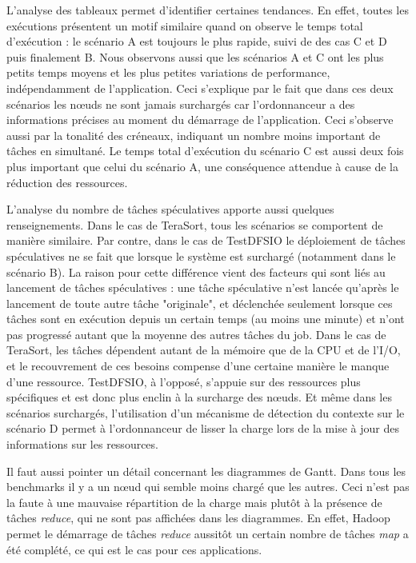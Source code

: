 L'analyse des tableaux permet d'identifier certaines tendances. En effet, toutes les exécutions présentent un motif similaire quand on observe le temps total d'exécution : le scénario A est toujours le plus rapide, suivi de des cas C et D puis finalement  B. Nous observons aussi que les scénarios A et C ont les plus petits temps moyens et les plus petites variations de performance, indépendamment de l'application. Ceci s'explique par le fait que dans ces deux scénarios les n{\oe}uds ne sont jamais surchargés car l'ordonnanceur a des informations précises au moment du démarrage de l'application. Ceci s'observe aussi par la tonalité des créneaux, indiquant un nombre moins important de tâches en simultané. Le temps total d'exécution du scénario C est aussi deux fois plus important que celui du scénario A, une conséquence attendue à cause de la réduction des ressources. 

L'analyse du nombre de tâches spéculatives apporte aussi quelques renseignements. Dans le cas de TeraSort, tous les scénarios se comportent de manière similaire. Par contre, dans le cas de TestDFSIO le déploiement de tâches spéculatives ne se fait que lorsque le système est surchargé (notamment dans le scénario B). La raison pour cette différence vient des facteurs qui sont liés au lancement de tâches spéculatives : une tâche spéculative n'est lancée qu'après le lancement de toute autre tâche "originale", et déclenchée seulement lorsque ces tâches sont en exécution depuis un certain temps (au moins une minute) et n'ont pas progressé autant que la moyenne des autres tâches du job. Dans le cas de TeraSort, les tâches dépendent autant de la mémoire que de la CPU et de l'I/O, et le recouvrement de ces besoins compense d'une certaine manière le manque d'une ressource. TestDFSIO, à l'opposé, s'appuie sur des ressources plus spécifiques et est donc plus enclin à la surcharge des n{\oe}uds. Et même dans les scénarios surchargés, l'utilisation d'un mécanisme de détection du contexte sur le scénario D permet à l'ordonnanceur de lisser la charge lors de la mise à jour des informations sur les ressources.

Il faut aussi pointer un détail concernant les diagrammes de Gantt. Dans tous les benchmarks il y a un n{\oe}ud qui semble moins chargé que les autres. Ceci n'est pas la faute à une mauvaise répartition de la charge mais plutôt à la présence de tâches \textit{reduce}, qui ne sont pas affichées dans les diagrammes. En effet, Hadoop permet le démarrage de tâches \textit{reduce} aussitôt un certain nombre de tâches \textit{map} a été complété, ce qui est le cas pour ces applications.



